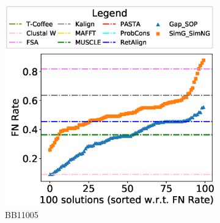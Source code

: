 


\begin{figure}[!htbp]
	\begin{adjustwidth}{-1cm}{-1cm}
		\centering
		\begin{subfigure}[b]{0.26\textwidth}
			\includegraphics[width=\columnwidth]{Figure/summary/precomputedInit/Balibase/BB11005_fnrate_density_single_run}
			\caption{BB11005}
		\end{subfigure}    
		\begin{subfigure}[b]{0.26\textwidth}

\end{subfigure}
\end{adjustwidth}
\end{figure}

